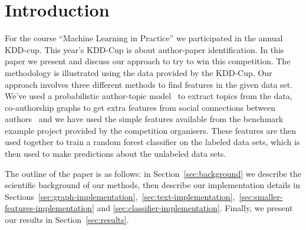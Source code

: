 \section*{Introduction}

For the course ``Machine Learning in Practice'' we participated in the annual KDD-cup.
This year's KDD-Cup is about author-paper identification.
In this paper we present and discuss our approach to try to win this competition.
The methodology is illustrated using the data provided by the KDD-Cup.
Our approach involves three different methods to find features in the given data set.
We've used a probabilistic author-topic model~\cite{steyvers2004probabilistic} to extract topics from  the data, co-authorship graphs to get extra features from social connections between authors~\cite{liu2005co} and we have used the simple features available from the benchmark example project provided by the competition organisers.
These features are then used together to train a random forest classifier on the labeled data sets, which is then used to make predictions about the unlabeled data sets.

The outline of the paper is as follows: in Section~\ref{sec:background} we describe the scientific background of our methods, then describe our implementation details in Sections~\ref{sec:graph-implementation},~\ref{sec:text-implementation},~\ref{sec:smaller-features-implementation} and \ref{sec:classifier-implementation}. Finally, we present our results in Section~\ref{sec:results}.
